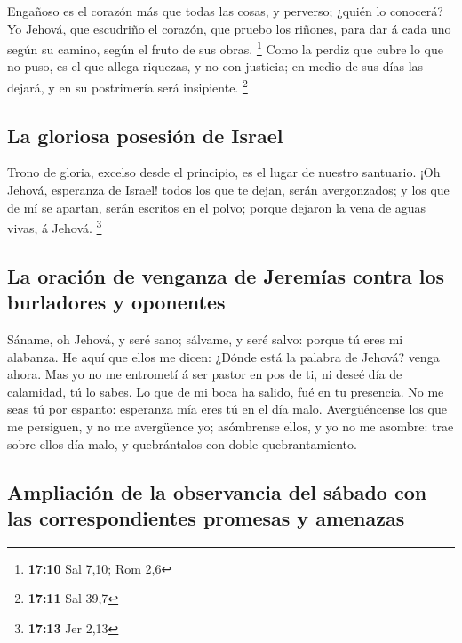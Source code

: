  Engañoso es el corazón más que todas las cosas, y perverso;
¿quién lo conocerá?  Yo Jehová, que escudriño el corazón,
que pruebo los riñones, para dar á cada uno según su camino, según el
fruto de sus obras. \footnote{\textbf{17:10} Sal 7,10; Rom 2,6}
 Como la perdiz que cubre lo que no puso, es el que allega
riquezas, y no con justicia; en medio de sus días las dejará, y en su
postrimería será insipiente. \footnote{\textbf{17:11} Sal 39,7}

\hypertarget{la-gloriosa-posesiuxf3n-de-israel}{%
\subsection{La gloriosa posesión de
Israel}\label{la-gloriosa-posesiuxf3n-de-israel}}

 Trono de gloria, excelso desde el principio, es el lugar
de nuestro santuario.  ¡Oh Jehová, esperanza de Israel!
todos los que te dejan, serán avergonzados; y los que de mí se apartan,
serán escritos en el polvo; porque dejaron la vena de aguas vivas, á
Jehová. \footnote{\textbf{17:13} Jer 2,13}

\hypertarget{la-oraciuxf3n-de-venganza-de-jeremuxedas-contra-los-burladores-y-oponentes}{%
\subsection{La oración de venganza de Jeremías contra los burladores y
oponentes}\label{la-oraciuxf3n-de-venganza-de-jeremuxedas-contra-los-burladores-y-oponentes}}

 Sáname, oh Jehová, y seré sano; sálvame, y seré salvo:
porque tú eres mi alabanza.  He aquí que ellos me dicen:
¿Dónde está la palabra de Jehová? venga ahora.  Mas yo no
me entrometí á ser pastor en pos de ti, ni deseé día de calamidad, tú lo
sabes. Lo que de mi boca ha salido, fué en tu presencia. 
No me seas tú por espanto: esperanza mía eres tú en el día malo.
 Avergüéncense los que me persiguen, y no me avergüence yo;
asómbrense ellos, y yo no me asombre: trae sobre ellos día malo, y
quebrántalos con doble quebrantamiento.

\hypertarget{ampliaciuxf3n-de-la-observancia-del-suxe1bado-con-las-correspondientes-promesas-y-amenazas}{%
\subsection{Ampliación de la observancia del sábado con las
correspondientes promesas y
amenazas}\label{ampliaciuxf3n-de-la-observancia-del-suxe1bado-con-las-correspondientes-promesas-y-amenazas}}

